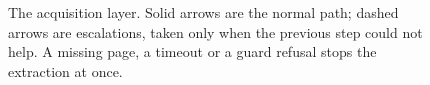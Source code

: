 \begin{figure}[ht]
\caption{The acquisition layer. Solid arrows are the normal path;
dashed arrows are escalations, taken only when the previous step could
not help. A missing page, a timeout or a guard refusal stops the
extraction at once.}
\label{fig:acquisition}
\end{figure}
